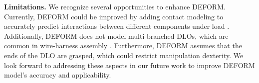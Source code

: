 \documentclass{article}
\begin{document}
\textbf{Limitations. }We recognize several opportunities to enhance DEFORM.
Currently, DEFORM could be improved by adding contact modeling to accurately predict interactions between different components under load \cite{DER_contact}. 
Additionally, DEFORM does not model multi-branched DLOs, which are common in wire-harness assembly \cite{wireharness}.
Furthermore, DEFORM assumes that the ends of the DLO are grasped, which could restrict manipulation dexterity.
We look forward to addressing these aspects in our future work to improve DEFORM model’s accuracy and applicability.

\clearpage


\clearpage

\appendix




% 
\end{document}
